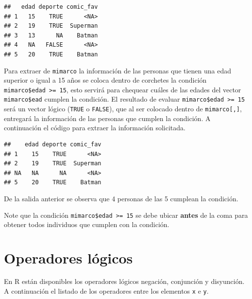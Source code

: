 \documentclass[
]{book}
\makeatletter
\newenvironment{Shaded}{\begin{snugshade}}{\end{snugshade}}
\newcommand{\DecValTok}[1]{\textcolor[rgb]{0.00,0.00,0.81}{#1}}
\newcommand{\NormalTok}[1]{#1}
\newcommand{\SpecialCharTok}[1]{\textcolor[rgb]{0.00,0.00,0.00}{#1}}
\newenvironment{kframe}{%
\medskip{}
\setlength{\fboxsep}{.8em}
 \def\at@end@of@kframe{}%
 \ifinner\ifhmode%
  \def\at@end@of@kframe{\end{minipage}}%
  \begin{minipage}{\columnwidth}%
 \fi\fi%
 \def\FrameCommand##1{\hskip\@totalleftmargin \hskip-\fboxsep
 \colorbox{shadecolor}{##1}\hskip-\fboxsep
     \hskip-\linewidth \hskip-\@totalleftmargin \hskip\columnwidth}%
 \MakeFramed {\advance\hsize-\width
   \@totalleftmargin\z@ \linewidth\hsize
   \@setminipage}}%
 {\par\unskip\endMakeFramed%
 \at@end@of@kframe}
\renewenvironment{Shaded}{\begin{kframe}}{\end{kframe}}
\newenvironment{rmdblock}[1]
  {
  \begin{itemize}
  \renewcommand{\labelitemi}{
    \raisebox{-.7\height}[0pt][0pt]{
      {\setkeys{Gin}{width=3em,keepaspectratio}\texttt{[image: images/\#1]}}
    }
  }
  \setlength{\fboxsep}{1em}
  \begin{kframe}
  \item
  }
  {
  \end{kframe}
  \end{itemize}
  }
\newenvironment{rmdwarning}
  {\begin{rmdblock}{warning}}
  {\end{rmdblock}}
\makeatother
\begin{document}
\begin{verbatim}
##   edad deporte comic_fav
## 1   15    TRUE      <NA>
## 2   19    TRUE  Superman
## 3   13      NA    Batman
## 4   NA   FALSE      <NA>
## 5   20    TRUE    Batman
\end{verbatim}

Para extraer de \texttt{mimarco} la información de las personas que tienen una edad superior o igual a 15 años se coloca dentro de corchetes la condición \texttt{mimarco\$edad\ \textgreater{}=\ 15}, esto servirá para chequear cuáles de las edades del vector \texttt{mimarco\$ead} cumplen la condición. El resultado de evaluar \texttt{mimarco\$edad\ \textgreater{}=\ 15} será un vector lógico (\texttt{TRUE} o \texttt{FALSE}), que al ser colocado dentro de \texttt{mimarco{[},{]}}, entregará la información de las personas que cumplen la condición. A continuación el código para extraer la información solicitada.

\begin{Shaded}
\end{Shaded}

\begin{verbatim}
##    edad deporte comic_fav
## 1    15    TRUE      <NA>
## 2    19    TRUE  Superman
## NA   NA      NA      <NA>
## 5    20    TRUE    Batman
\end{verbatim}

De la salida anterior se observa que 4 personas de las 5 cumplean la condición.

\begin{rmdwarning}
Note que la condición \texttt{mimarco\$edad\ \textgreater{}=\ 15} se debe ubicar \textbf{antes} de la coma para obtener todos individuos que cumplen con la condición.
\end{rmdwarning}

\hypertarget{operadores-luxf3gicos}{%
\section{Operadores lógicos}\label{operadores-luxf3gicos}}

En R están disponibles los operadores lógicos negación, conjunción y disyunción. A continuación el listado de los operadores entre los elementos \texttt{x} e \texttt{y}.
\end{document}
